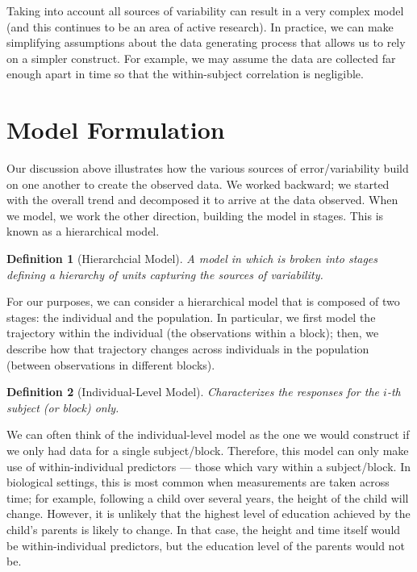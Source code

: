 \documentclass[
]{book}
\theoremstyle{plain}
\theoremstyle{mydefn}
\newtheorem{definition}{Definition}[chapter]
\theoremstyle{myexmpl}
\theoremstyle{remark}
\begin{document}
Taking into account all sources of variability can result in a very complex model (and this continues to be an area of active research). In practice, we can make simplifying assumptions about the data generating process that allows us to rely on a simpler construct. For example, we may assume the data are collected far enough apart in time so that the within-subject correlation is negligible.

\hypertarget{model-formulation}{%
\section{Model Formulation}\label{model-formulation}}

Our discussion above illustrates how the various sources of error/variability build on one another to create the observed data. We worked backward; we started with the overall trend and decomposed it to arrive at the data observed. When we model, we work the other direction, building the model in stages. This is known as a hierarchical model.

\begin{definition}[Hierarchcial Model]
\protect\hypertarget{def:defn-hierarchical-model}{}{\label{def:defn-hierarchical-model} {} }A model in which is broken into stages defining a hierarchy of units capturing the sources of variability.
\end{definition}

For our purposes, we can consider a hierarchical model that is composed of two stages: the individual and the population. In particular, we first model the trajectory within the individual (the observations within a block); then, we describe how that trajectory changes across individuals in the population (between observations in different blocks).

\begin{definition}[Individual-Level Model]
\protect\hypertarget{def:defn-individual-model}{}{\label{def:defn-individual-model} {} }Characterizes the responses for the \(i\)-th subject (or block) only.
\end{definition}

We can often think of the individual-level model as the one we would construct if we only had data for a single subject/block. Therefore, this model can only make use of within-individual predictors --- those which vary within a subject/block. In biological settings, this is most common when measurements are taken across time; for example, following a child over several years, the height of the child will change. However, it is unlikely that the highest level of education achieved by the child's parents is likely to change. In that case, the height and time itself would be within-individual predictors, but the education level of the parents would not be.
\end{document}
